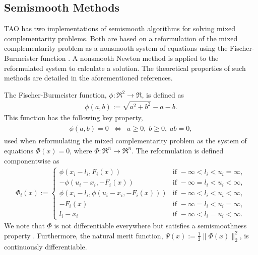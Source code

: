 \subsection{Semismooth Methods}

TAO has two implementations of semismooth algorithms 
\cite{munson.facchinei.ea:semismooth, deluca.facchinei.ea:semismooth, 
facchinei.fischer.ea:semismooth} for solving mixed complementarity problems.
Both are based on a reformulation of the mixed complementarity problem
as a nonsmooth system of equations using the Fischer-Burmeister 
function \cite{fischer:special}.  A nonsmooth Newton method is applied to
the reformulated system to calculate a solution.  The theoretical properties
of such methods are detailed in the aforementioned references.

The Fischer-Burmeister function, $\phi:\Re^2 \to \Re$, is defined as
\begin{eqnarray*}
\phi(a,b) := \sqrt{a^2 + b^2} - a - b.
\end{eqnarray*}
This function has the following key property,
\begin{eqnarray*}
\begin{array}{lcr}
        \phi(a,b) = 0 & \Leftrightarrow & a \geq 0,\; b \geq 0,\; ab = 0,
\end{array}
\end{eqnarray*}
used when reformulating the mixed complementarity problem as the system of 
equations $\Phi(x) = 0$, where $\Phi:\Re^n \to \Re^n$.  
The reformulation is defined componentwise as
\begin{eqnarray*}
\Phi_i(x) := \left\{ \begin{array}{ll}
   \phi(x_i - l_i, F_i(x)) & \mbox{if } -\infty < l_i < u_i = \infty, \\
   -\phi(u_i-x_i, -F_i(x)) & \mbox{if } -\infty = l_i < u_i < \infty, \\
   \phi(x_i - l_i, \phi(u_i - x_i, - F_i(x))) & \mbox{if } -\infty < l_i < u_i < \infty, \\
   -F_i(x) & \mbox{if } -\infty = l_i < u_i = \infty, \\
   l_i - x_i & \mbox{if } -\infty < l_i = u_i < \infty.
   \end{array} \right.
\end{eqnarray*}
We note that $\Phi$ is not differentiable everywhere but satisfies a
semismoothness property 
\cite{mifflin:semismooth, qi:convergence, qi.sun:nonsmooth}.  Furthermore,
the natural merit function, $\Psi(x) := \frac{1}{2} \| \Phi(x) \|_2^2$, is 
continuously differentiable.

